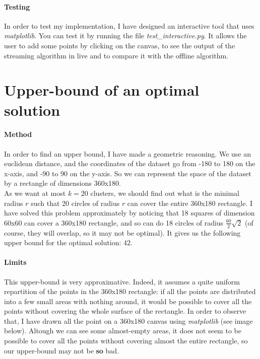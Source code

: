 \documentclass[a4paper]{article}%
\begin{document}
	\paragraph{Testing} In order to test my implementation, I have designed an interactive tool that uses
	\textit{matplotlib}. You can test it by running the file \textit{test\_interactive.py}. It allows the user to
	add some points by clicking on the canvas, to see the output of the streaming algorithm in live and to compare it
	with the offline algorithm.

	\section{Upper-bound of an optimal solution}

	\paragraph{Method}
	In order to find an upper bound, I have made a geometric reasoning.
	We use an euclidean distance, and the coordinates of the dataset go from -180 to 180 on the x-axis, and -90 to 90 on the y-axis.
	So we can represent the space of the dataset by a rectangle of dimensions 360x180.\\

	As we want at most $k=20$ clusters, we should find out what is the minimal radius $r$ such that 20 circles of radius $r$
	can cover the entire 360x180 rectangle. I have solved this problem approximately by noticing that 18 squares of dimension 60x60
	can cover a 360x180 rectangle, and so can do 18 circles of radius $\frac{60}{2}\sqrt{2}$ (of course, they will overlap, so it may not be optimal).
	It gives us the following upper bound for the optimal solution: 42.

	\paragraph{Limits}

	This upper-bound is very approximative. Indeed, it assumes a quite uniform repartition of the points in the 360x180 rectangle:
	if all the points are distributed into a few small areas with nothing around, it would be possible to cover all the points without covering
	the whole surface of the rectangle. In order to observe that, I have drawn all the point on a 360x180 canvas using \textit{matplotlib} (see image below).
	Altough we can see some almost-empty areas, it does not seem to be possible to cover all the points without covering almost the entire rectangle,
	so our upper-bound may not be \textbf{so} bad.\\
\end{document}
